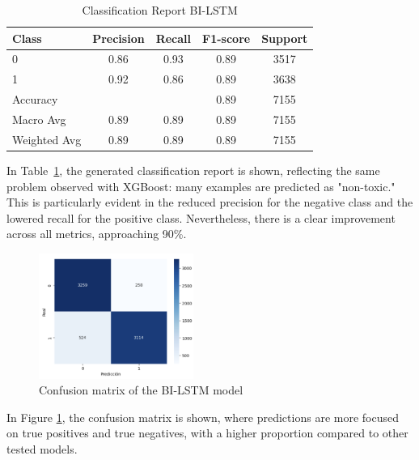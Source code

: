 \begin{table}[H]
\centering
\caption{Classification Report BI-LSTM}
\label{tab:classification_report}
\begin{tabular}{lcccc}
\toprule
Class        & Precision & Recall & F1-score & Support \\
\midrule
0            & 0.86      & 0.93   & 0.89     & 3517    \\
1            & 0.92      & 0.86   & 0.89     & 3638    \\
\midrule
Accuracy     &           &        & 0.89     & 7155    \\
Macro Avg    & 0.89      & 0.89   & 0.89     & 7155    \\
Weighted Avg & 0.89      & 0.89   & 0.89     & 7155    \\
\bottomrule
\end{tabular}
\end{table}

In Table~\ref{tab:classification_report}, the generated classification report is shown, reflecting the same problem observed with XGBoost: many examples are predicted as "non-toxic." This is particularly evident in the reduced precision for the negative class and the lowered recall for the positive class. Nevertheless, there is a clear improvement across all metrics, approaching 90\%.

\begin{figure}[H]
    \centering
    \includegraphics[width=0.45\textwidth]{images/confusion_matrix_bilstm.png}
    \caption{Confusion matrix of the BI-LSTM model}
    \label{fig:confusion_matrix_bilstm}
\end{figure}

In Figure \ref{fig:confusion_matrix_bilstm}, the confusion matrix is shown, where predictions are more focused on true positives and true negatives, with a higher proportion compared to other tested models.